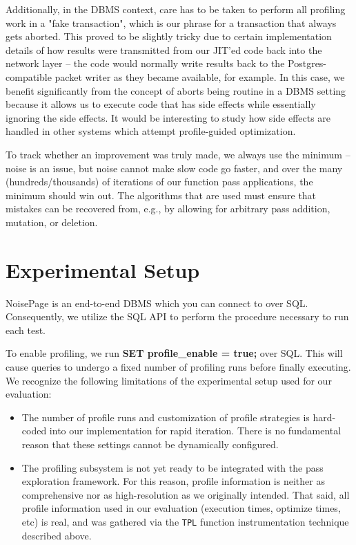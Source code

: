 \documentclass{vldb}
\newcommand{\tpl}{\texttt{TPL}\xspace}
\newcommand{\dbCode}[1]{{\sffamily\small \textbf{#1}}\xspace}
\begin{document}
Additionally, in the DBMS context, care has to be taken to perform all profiling work in a "fake transaction", which is our phrase for a transaction that always gets aborted. This proved to be slightly tricky due to certain implementation details of how results were transmitted from our JIT'ed code back into the network layer -- the code would normally write results back to the Postgres-compatible packet writer as they became available, for example. In this case, we benefit significantly from the concept of aborts being routine in a DBMS setting because it allows us to execute code that has side effects while essentially ignoring the side effects. It would be interesting to study how side effects are handled in other systems which attempt profile-guided optimization.

To track whether an improvement was truly made, we always use the minimum -- noise is an issue, but noise cannot make slow code go faster, and over the many (hundreds/thousands) of iterations of our function pass applications, the minimum should win out. The algorithms that are used must ensure that mistakes can be recovered from, e.g., by allowing for arbitrary pass addition, mutation, or deletion.


\section{Experimental Setup}

NoisePage is an end-to-end DBMS which you can connect to over SQL. Consequently, we utilize the SQL API to perform the procedure necessary to run each test.

To enable profiling, we run \dbCode{SET profile\_enable = true;} over SQL. This will cause queries to undergo a fixed number of profiling runs before finally executing. We recognize the following limitations of the experimental setup used for our evaluation:
\begin{itemize}
    \item The number of profile runs and customization of profile strategies is hard-coded into our implementation for rapid iteration. There is no fundamental reason that these settings cannot be dynamically configured.
    \item The profiling subsystem is not yet ready to be integrated with the pass exploration framework. For this reason, profile information is neither as comprehensive nor as high-resolution as we originally intended. That said, all profile information used in our evaluation (execution times, optimize times, etc) is real, and was gathered via the \tpl function instrumentation technique described above.
\end{itemize}
\end{document}
